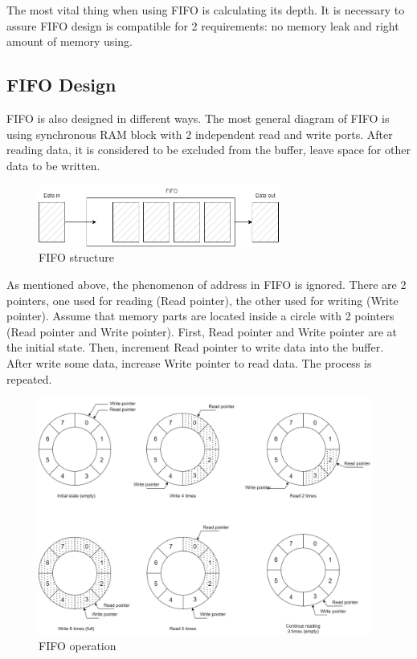 \documentclass[a4paper, 12pt]{report}
\begin{document}
The most vital thing when using FIFO is calculating its depth. It is necessary to assure FIFO design is compatible for 2 requirements: no memory leak and right amount of memory using.

\subsection{FIFO Design}
FIFO is also designed in different ways. The most general diagram of FIFO is using synchronous RAM block with 2 independent read and write ports. After reading data, it is considered to be excluded from the buffer, leave space for other data to be written.
\begin{figure}[H]
    \centering
    \includegraphics[width = 8cm]{picture/fifo/fifo.drawio.png}
    \caption{FIFO structure}
    \medskip
\end{figure}
As mentioned above, the phenomenon of address in FIFO is ignored. There are 2 pointers, one used for reading (Read pointer), the other used for writing (Write pointer). Assume that memory parts are located inside a circle with 2 pointers (Read pointer and Write pointer). First, Read pointer and Write pointer are at the initial state. Then, increment Read pointer to write data into the buffer. After write some data, increase Write pointer to read data. The process is repeated.
\begin{figure}[H]
    \centering
    \includegraphics[width = 11cm]{picture/fifo/fifo-image.drawio.png}
    \caption{FIFO operation}
    \medskip
\end{figure}
\end{document}
